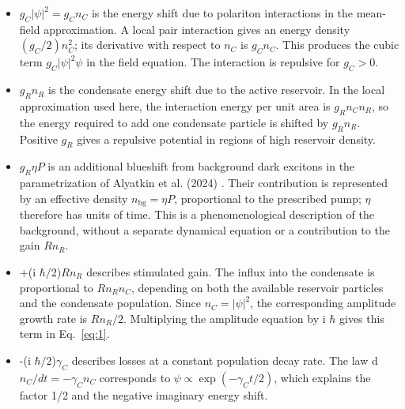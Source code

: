 \documentclass[12pt,a4paper]{article}
\begin{document}
\begin{itemize}\setlength{\itemsep}{3pt}\item $g_{C}|\psi|^2=g_{C} n_{C}$ is the energy shift due to polariton interactions in the mean-field approximation. A local pair interaction gives an energy density $(g_{C}/2)n_{C}^{2}$; its derivative with respect to $n_{C}$ is $g_{C} n_{C}$. This produces the cubic term $g_{C}|\psi|^2 \psi$ in the field equation. The interaction is repulsive for $g_{C}>0$.\end{itemize}

\begin{itemize}\setlength{\itemsep}{3pt}\item $g_{R} n_{R}$ is the condensate energy shift due to the active reservoir. In the local approximation used here, the interaction energy per unit area is $g_{R} n_{C} n_{R}$, so the energy required to add one condensate particle is shifted by $g_{R} n_{R}$. Positive $g_{R}$ gives a repulsive potential in regions of high reservoir density.\end{itemize}

\begin{itemize}\setlength{\itemsep}{3pt}\item $g_{R} \eta P$ is an additional blueshift from background dark excitons in the parametrization of Alyatkin et al. (2024) \cite{ref3}. Their contribution is represented by an effective density $n_{\mathrm{bg}}=\eta P$, proportional to the prescribed pump; $\eta$ therefore has units of time. This is a phenomenological description of the background, without a separate dynamical equation or a contribution to the gain $R n_{R}$.\end{itemize}

\begin{itemize}\setlength{\itemsep}{3pt}\item +(i $\hbar/2$)$R n_{R}$ describes stimulated gain. The influx into the condensate is proportional to $R n_{R} n_{C}$, depending on both the available reservoir particles and the condensate population. Since $n_{C}=|\psi|^2$, the corresponding amplitude growth rate is $R n_{R}/2$. Multiplying the amplitude equation by i $\hbar$ gives this term in Eq.~\eqref{eq:1}.\end{itemize}

\begin{itemize}\setlength{\itemsep}{3pt}\item -(i $\hbar/2$)$\gamma_{C}$ describes losses at a constant population decay rate. The law d $n_{C}/dt=-\gamma_{C} n_{C}$ corresponds to $\psi\propto\exp(-\gamma_{C} t/2)$, which explains the factor 1/2 and the negative imaginary energy shift.\end{itemize}
\end{document}
